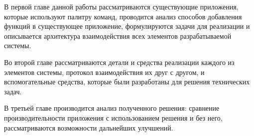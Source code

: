В первой главе данной работы рассматриваются существующие приложения, которые
используют палитру команд, проводится анализ способов добавления функций в
существующее приложение, формулируются задачи для реализации и описывается
архитектура взаимодействия всех элементов разрабатываемой системы.

Во второй главе рассматриваются детали и средства реализации каждого из элементов
системы, протокол взаимодействия их друг с другом, и вспомогательные
средства, которые были разработаны для решения технических задач.

В третьей главе производится анализ полученного решения: сравнение
производительности приложения с использованием решения и без него,
рассматриваются возможности дальнейших улучшений.
